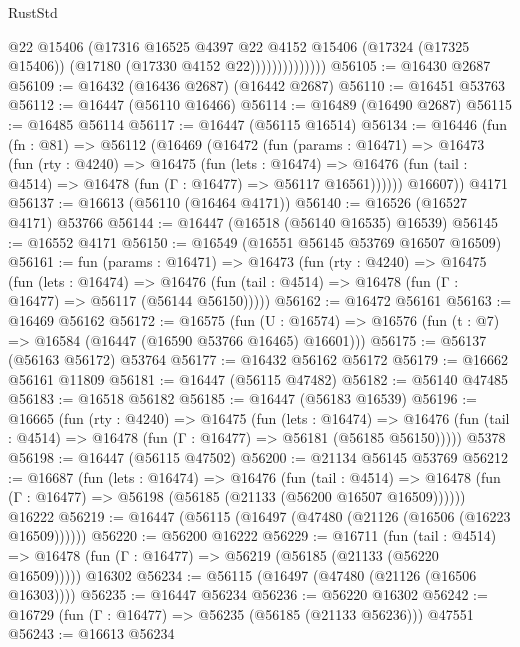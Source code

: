 \begin{lexlean}{RustStd}
\begin{coremodule}
{\begin{coremodule}
{{{{{{{{{{{{{{{{{{{{{{{{{{{{{{{{{{{{{{{{{{{{{{{{{{{{{{{                          @22
                          @15406
                          (@17316
                            @16525
                            @4397
                            @22
                            @4152
                            @15406
                            (@17324 (@17325 @15406))
                            (@17180 (@17330 @4152 @22))))))))))))))
@56105 := @16430 @2687
@56109 := @16432 (@16436 @2687) (@16442 @2687)
@56110 := @16451 @53763
@56112 := @16447 (@56110 @16466)
@56114 := @16489 (@16490 @2687)
@56115 := @16485 @56114
@56117 := @16447 (@56115 @16514)
@56134 := @16446
    (fun (fn : @81) =>
    @56112
      (@16469
        (@16472
          (fun (params : @16471) =>
          @16473
            (fun (rty : @4240) =>
            @16475
              (fun (lets : @16474) =>
              @16476 (fun (tail : @4514) => @16478 (fun (Γ : @16477) => @56117 @16561))))))
        @16607))
    @4171
@56137 := @16613 (@56110 (@16464 @4171))
@56140 := @16526 (@16527 @4171) @53766
@56144 := @16447 (@16518 (@56140 @16535) @16539)
@56145 := @16552 @4171
@56150 := @16549 (@16551 @56145 @53769 @16507 @16509)
@56161 := fun (params : @16471) =>
  @16473
    (fun (rty : @4240) =>
    @16475
      (fun (lets : @16474) =>
      @16476 (fun (tail : @4514) => @16478 (fun (Γ : @16477) => @56117 (@56144 @56150)))))
@56162 := @16472 @56161
@56163 := @16469 @56162
@56172 := @16575
    (fun (U : @16574) => @16576 (fun (t : @7) => @16584 (@16447 (@16590 @53766 @16465) @16601)))
@56175 := @56137 (@56163 @56172) @53764
@56177 := @16432 @56162 @56172
@56179 := @16662 @56161 @11809
@56181 := @16447 (@56115 @47482)
@56182 := @56140 @47485
@56183 := @16518 @56182
@56185 := @16447 (@56183 @16539)
@56196 := @16665
    (fun (rty : @4240) =>
    @16475
      (fun (lets : @16474) =>
      @16476 (fun (tail : @4514) => @16478 (fun (Γ : @16477) => @56181 (@56185 @56150)))))
    @5378
@56198 := @16447 (@56115 @47502)
@56200 := @21134 @56145 @53769
@56212 := @16687
    (fun (lets : @16474) =>
    @16476
      (fun (tail : @4514) =>
      @16478 (fun (Γ : @16477) => @56198 (@56185 (@21133 (@56200 @16507 @16509))))))
    @16222
@56219 := @16447 (@56115 (@16497 (@47480 (@21126 (@16506 (@16223 @16509))))))
@56220 := @56200 @16222
@56229 := @16711
    (fun (tail : @4514) => @16478 (fun (Γ : @16477) => @56219 (@56185 (@21133 (@56220 @16509)))))
    @16302
@56234 := @56115 (@16497 (@47480 (@21126 (@16506 @16303))))
@56235 := @16447 @56234
@56236 := @56220 @16302
@56242 := @16729 (fun (Γ : @16477) => @56235 (@56185 (@21133 @56236))) @47551
@56243 := @16613 @56234
}}}}}}}}}}}}}}}}}}}}}}}}}}}}}}}}}}}}}}}}}}}}}}}}}}}}}}}
\end{coremodule}}
\end{coremodule}
\end{lexlean}
